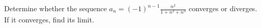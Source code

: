 \documentclass{ximera}
\begin{document}
\begin{question}%

Determine whether the sequence \(\displaystyle a_n = (-1)^{n-1} \frac{n^2}{1 + n^2 + n^3}\) converges or diverges. If it converges, find its limit.
\begin{multiplechoice}
\end{multiplechoice}

\end{question}
\end{document}
